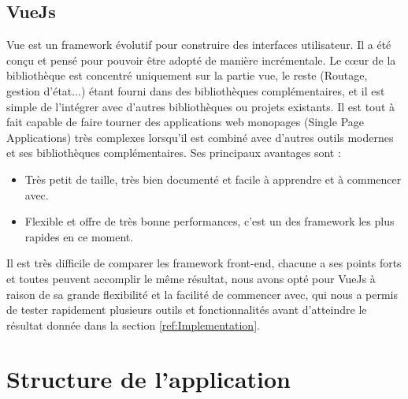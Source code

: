 \subsection{VueJs}
Vue est un framework évolutif pour construire des interfaces utilisateur. Il a été conçu et pensé pour pouvoir être adopté de manière incrémentale. Le cœur de la bibliothèque est concentré uniquement sur la partie vue, le reste (Routage, gestion d'état...) étant fourni dans des bibliothèques complémentaires, et il est simple de l'intégrer avec d'autres bibliothèques ou projets existants. 
Il est tout à fait capable de faire tourner des applications web monopages (Single Page Applications) très complexes lorsqu'il est combiné avec d'autres outils modernes et ses bibliothèques complémentaires.\newline
Ses principaux avantages sont : 
\begin{itemize}
	\item Très petit de taille, très bien documenté et facile à apprendre et à commencer avec.
	\item Flexible et offre de très bonne performances, c'est un des framework les plus rapides en ce moment.
\end{itemize}

Il est très difficile de comparer les framework front-end, chacune a ses points forts et toutes peuvent accomplir le même résultat, nous avons opté pour VueJs à raison de sa grande flexibilité et la facilité de commencer avec, qui nous a permis de tester rapidement plusieurs outils et fonctionnalités avant d'atteindre le résultat donnée dans la section \ref{ref:Implementation}.

\section{Structure de l'application}
